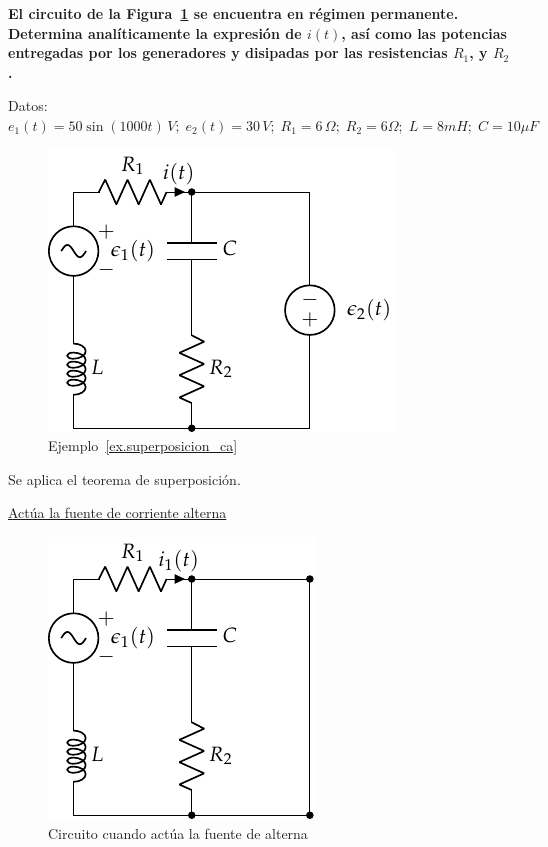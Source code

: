 \documentclass[11pt]{book} %
\begin{document}
	
	\begin{example}\label{ex.superposicion_ca}
\textbf{El circuito de la Figura~\ref{fig.superposicion1} se encuentra en régimen permanente. Determina
analíticamente la expresión de $i(t)$, así como las potencias entregadas por los
generadores y disipadas por las resistencias $R_1$, y $R_2$.}

Datos: $e_1(t) = {50 \sin(1000 t)}\,V;\; e_2(t) = {30}\,V;\; R_1 = 6\,\Omega;\; R_2 = {6}{\Omega};\; L = {8}{mH};\; C = {10}{\mu F}$

\begin{figure}[H]
    \centering
    \includegraphics{../figs/superposicion1.pdf}
    \caption{Ejemplo~\ref{ex.superposicion_ca}}
    \label{fig.superposicion1}
\end{figure}

Se aplica el teorema de superposición. 

\underline{Actúa la fuente de corriente alterna}

\begin{figure}[H]
    \centering
    \includegraphics{../figs/superposicion1_AC.pdf}
    \caption{Circuito cuando actúa la fuente de alterna}
    \label{fig.superposicion1_AC}
\end{figure}


\end{example}
\end{document}
